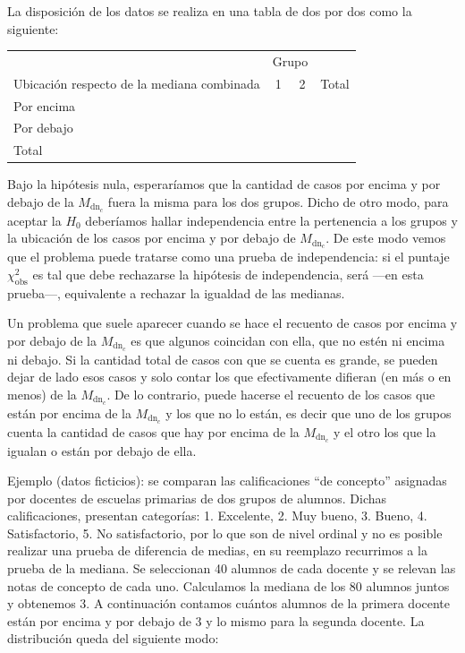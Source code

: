 \documentclass[]{book}
\begin{document}
La disposición de los datos se realiza en una tabla de dos por dos como
la siguiente:

\begin{table}[H]
\centering
\begin{tabular}{lccl}
\toprule
\multicolumn{1}{c}{ } & \multicolumn{2}{c}{Grupo} & \multicolumn{1}{c}{ } \\
\cmidrule(l{3pt}r{3pt}){2-3}
Ubicación respecto de la mediana combinada & 1 & 2 & Total\\
\midrule
\rowcolor{gray!6}  Por encima &  &  & \\
Por debajo &  &  & \\
\rowcolor{gray!6}  Total &  &  & \\
\bottomrule
\end{tabular}
\end{table}

Bajo la hipótesis nula, esperaríamos que la cantidad de casos por encima
y por debajo de la \(M_{\text{dn}_{c}}\) fuera la misma para los dos
grupos. Dicho de otro modo, para aceptar la \(H_0\) deberíamos hallar
independencia entre la pertenencia a los grupos y la ubicación de los
casos por encima y por debajo de \(M_{\text{dn}_{c}}\). De este modo vemos
que el problema puede tratarse como una prueba de independencia: si el
puntaje \(\chi_{\text{obs}}^{2}\) es tal que debe rechazarse la hipótesis
de independencia, será ---en esta prueba---, equivalente a rechazar la
igualdad de las medianas.

Un problema que suele aparecer cuando se hace el recuento de casos por
encima y por debajo de la \(M_{\text{dn}_{c}}\) es que algunos coincidan
con ella, que no estén ni encima ni debajo. Si la cantidad total de
casos con que se cuenta es grande, se pueden dejar de lado esos casos y
solo contar los que efectivamente difieran (en más o en menos) de la
\(M_{\text{dn}_{c}}\). De lo contrario, puede hacerse el recuento de los
casos que están por encima de la \(M_{\text{dn}_{c}}\) y los que no lo
están, es decir que uno de los grupos cuenta la cantidad de casos que
hay por encima de la \(M_{\text{dn}_{c}}\) y el otro los que la igualan o
están por debajo de ella.

Ejemplo (datos ficticios): se comparan las calificaciones ``de concepto''
asignadas por docentes de escuelas primarias de dos grupos de alumnos.
Dichas calificaciones, presentan categorías: 1. Excelente, 2. Muy bueno,
3. Bueno, 4. Satisfactorio, 5. No satisfactorio, por lo que son de nivel
ordinal y no es posible realizar una prueba de diferencia de medias, en
su reemplazo recurrimos a la prueba de la mediana. Se seleccionan 40
alumnos de cada docente y se relevan las notas de concepto de cada uno.
Calculamos la mediana de los 80 alumnos juntos y obtenemos 3. A
continuación contamos cuántos alumnos de la primera docente están por
encima y por debajo de 3 y lo mismo para la segunda docente. La
distribución queda del siguiente modo:
\end{document}
